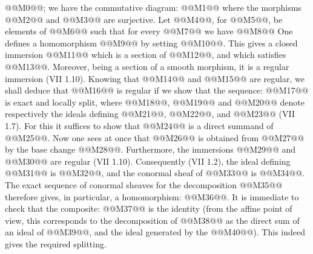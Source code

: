 @@M0@@; we have the commutative diagram:
@@M1@@
where the morphisms @@M2@@ and @@M3@@ are surjective. Let @@M4@@, for @@M5@@, be elements of @@M6@@ such that for every @@M7@@ we have
@@M8@@
One defines a homomorphism @@M9@@ by setting @@M10@@. This gives a closed immersion @@M11@@ which is a section of @@M12@@, and which satisfies @@M13@@. Moreover, being a section of a smooth morphism, it is a regular immersion (VII 1.10). Knowing that @@M14@@ and @@M15@@ are regular, we shall deduce that @@M16@@ is regular if we show that the sequence:
@@M17@@
is exact and locally split, where @@M18@@, @@M19@@ and @@M20@@ denote respectively the ideals defining @@M21@@, @@M22@@, and @@M23@@ (VII 1.7). For this it suffices to show that @@M24@@ is a direct summand of @@M25@@. Now one sees at once that @@M26@@ is obtained from @@M27@@ by the base change @@M28@@. Furthermore, the immersions @@M29@@ and @@M30@@ are regular (VII 1.10). Consequently (VII 1.2), the ideal defining @@M31@@ is @@M32@@, and the conormal sheaf of @@M33@@ is @@M34@@. The exact sequence of conormal sheaves for the decomposition @@M35@@ therefore gives, in particular, a homomorphism: @@M36@@. It is immediate to check that the composite: @@M37@@ is the identity (from the affine point of view, this corresponds to the decomposition of @@M38@@ as the direct sum of an ideal of @@M39@@, and the ideal generated by the @@M40@@). This indeed gives the required splitting.
